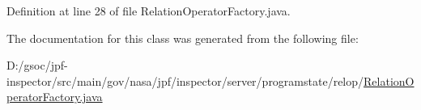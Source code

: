 Definition at line 28 of file Relation\+Operator\+Factory.\+java.



The documentation for this class was generated from the following file\+:\begin{DoxyCompactItemize}
\item 
D\+:/gsoc/jpf-\/inspector/src/main/gov/nasa/jpf/inspector/server/programstate/relop/\hyperlink{_relation_operator_factory_8java}{Relation\+Operator\+Factory.\+java}\end{DoxyCompactItemize}
